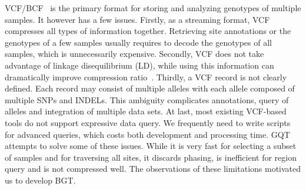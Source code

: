 \documentclass{bioinfo}
\begin{document}
VCF/BCF~\citep{Danecek:2011qy} is the primary format for storing and analyzing
genotypes of multiple samples.  It however has a few issues. Firstly, as a
streaming format, VCF compresses all types of information together. Retrieving
site annotations or the genotypes of a few samples usually requires to decode
the genotypes of all samples, which is unnecessarily expensive. Secondly, VCF
does not take advantage of linkage disequilibrium (LD), while using this
information can dramatically improve compression ratio~\citep{Durbin:2014yq}.
Thirdly, a VCF record is not clearly defined. Each record may consist of
multiple alleles with each allele composed of multiple SNPs and INDELs. This
ambiguity complicates annotations, query of alleles and integration of multiple
data sets. At last, most existing VCF-based tools do not support expressive
data query. We frequently need to write scripts for advanced queries, which
costs both development and processing time. GQT~\citep{Ruan:2015ab} attempts
to solve some of these issues. While it is very fast for selecting a subset of
samples and for traversing all sites, it discards phasing, is inefficient for
region query and is not compressed well. The observations of these limitations
motivated us to develop BGT.
\end{document}
